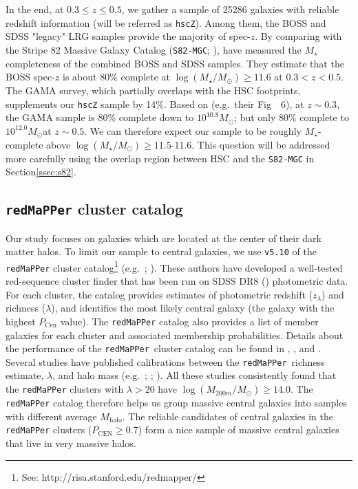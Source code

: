 \documentclass{emulateapj}
\def\msun{$M_\odot$}
\def\redm{\texttt{redMaPPer}}
\def\mstar{{$M_{\star}$}}
\def\mhalo{{$M_{\mathrm{halo}}$}}
\def\logms{{$\log (M_{\star}/M_{\odot})$}}
\begin{document}
\begin{CJK*}{UTF8}{gbsn}
    In the end, at $0.3 \leq z \leq 0.5$, we gather a sample of 25286 galaxies with 
    reliable redshift information (will be referred as \texttt{hscZ}).
    Among them, the BOSS and SDSS "legacy" LRG samples provide the majority of 
    spec-$z$. 
    By comparing with the Stripe 82 Massive Galaxy Catalog
    (\texttt{S82-MGC}; \citealt{Bundy2015}), \citet{Leauthaud2016} have measured the
    \mstar{} completeness of the combined BOSS and SDSS samples. 
    They estimate that the BOSS spec-$z$ is about 80\% complete at \logms{}$\geq 11.6$ 
    at $0.3 < z < 0.5$. 
    The GAMA survey, which partially overlaps with the HSC footprints, supplements 
    our \texttt{hscZ} sample by 14\%. 
    Based on \citet{Taylor2011} (e.g.\ their Fig~~6), at $z\sim 0.3$, the GAMA 
    sample is 80\% complete down to $10^{10.8}$\msun; but only 80\% complete to 
    $10^{12.0}$\msun at $z\sim 0.5$. 
    We can therefore expect our sample to be roughly \mstar{}-complete above 
    \logms{}$\geq 11.5$-$11.6$. 
    This question will be addressed more carefully using the overlap region between 
    HSC and the \texttt{S82-MGC} in Section\ref{ssec:s82}.

\subsection{\redm{}{} cluster catalog}
    \label{ssec:redmapper}
    
    Our study focuses on galaxies which are located at the center of their dark matter 
    halos. 
    To limit our sample to central galaxies, we use \texttt{v5.10} of the \redm{}{} 
    cluster catalog\footnote{See: http://risa.stanford.edu/redmapper/} 
    (e.g.\ \citealt{Rykoff2014}; \citealt{Rozo2015b}). 
    These authors have developed a well-tested red-sequence cluster finder that has 
    been run on SDSS DR8 (\citealt{SDSSDR8}) photometric data. 
    For each cluster, the catalog provides estimates of photometric redshift 
    ($z_{\lambda}$) and richness ($\lambda$), and identifies the most likely central
    galaxy (the galaxy with the highest $P_{\mathrm{Cen}}$ value). 
    The \redm{}{} catalog also provides a list of member galaxies for each cluster 
    and associated membership probabilities. 
    Details about the performance of the \redm{}~cluster catalog can be found in 
    \citet{Rozo2014}, \citet{Rozo2015a}, and \citet{Rozo2015b}. 
    Several studies have published calibrations between the \redm{}~richness estimate, 
    $\lambda$, and halo mass (e.g.\ \citealt{Saro2015}; \citealt{Farahi2016}; 
    \citealt{Simet2016}). 
    All these studies consistently found that the \redm{} clusters with $\lambda > 20$ 
    have $\log (M_{200m}/M_{\odot}) \geq 14.0$.
    The \redm{} catalog therefore helps us group massive central galaxies into samples 
    with different average \mhalo{}. 
    The reliable candidates of central galaxies in the \redm{} clusters 
    ($P_{\mathrm{CEN}} \geq 0.7$) form a nice sample of massive central galaxies 
    that live in very massive halos. 
    

\end{CJK*}
\end{document}
